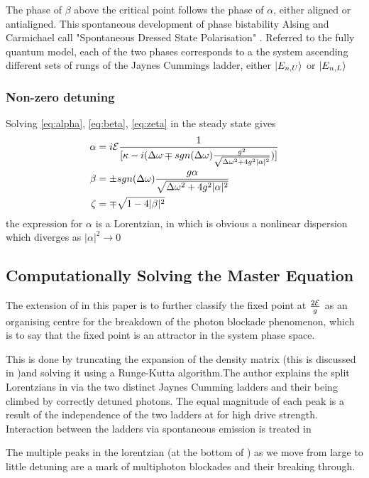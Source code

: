 The phase of $\beta$ above the critical point follows the phase of $\alpha$, either aligned or antialigned. This spontaneous development of phase bistability Alsing and Carmichael call "Spontaneous Dressed State Polarisation" \autocite{Alsing1999}. Referred to the fully quantum model, each of the two phases corresponds to a the system ascending different sets of rungs of the Jaynes Cummings ladder, either $| E_{n, U} \rangle$ or $| E_{n, L} \rangle$
\subsubsection{Non-zero detuning}
Solving \cref{eq:alpha}, \cref{eq:beta}, \cref{eq:zeta} in the steady state gives
\begin{align}
	\alpha& = i \mathcal{E}\frac{1}{[\kappa-i(\Delta \omega \mp sgn(\Delta \omega) \frac{g^2}{\sqrt{\Delta \omega^2 +4g^2 |\alpha|^2}})]} \\
	\beta& = \pm sgn(\Delta \omega) \frac{g \alpha}{\sqrt{\Delta \omega^2 + 4 g^2 |\alpha|^2}}\\
	\zeta& = \mp \sqrt{1-4|\beta|^2}
\end{align}
the expression for $\alpha$ is a Lorentzian, in which is obvious a nonlinear dispersion which diverges as $|\alpha|^2 \rightarrow 0$

\subsection{Computationally Solving the Master Equation}

The extension of \autocite{Alsing1999} in this paper is to further classify the fixed point at $\frac{2\mathcal{E}}{g}$ as an organising centre for the breakdown of the photon blockade phenomenon, which is to say that the fixed point is an attractor in the system phase space. 

This is done by truncating the expansion of the density matrix (this is discussed in \autocite{Savage1988})and solving it using a Runge-Kutta algorithm.The author explains the split Lorentzians in \autocite[Figure 1]{Carmichael2015} via the two distinct Jaynes Cumming ladders and their being climbed by correctly detuned photons. The equal magnitude of each peak is a result of the independence of the two ladders at for high drive strength. Interaction between the ladders via spontaneous emission is treated in \autocite[Section V]{Carmichael2015}

The multiple peaks in the lorentzian (at the bottom of \autocite[Figure 1]{Carmichael2015}) as we move from large to little detuning are a mark of multiphoton blockades and their breaking through.

